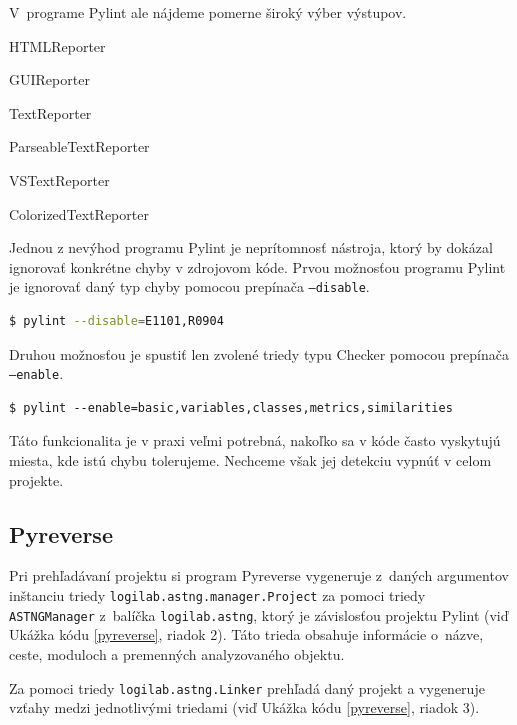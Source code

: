 \documentclass[11pt,oneside,final]{fithesis2}
\begin{document}
\begin{list}{•}{}
		V~programe Pylint ale nájdeme pomerne široký výber výstupov.
		
			    \begin{list}{•}{}
					\item HTMLReporter
					\item GUIReporter
					\item TextReporter
					\item ParseableTextReporter
					\item VSTextReporter
					\item ColorizedTextReporter
    			\end{list}
		
    \end{list}
	
Jednou z nevýhod programu Pylint je neprítomnosť nástroja, ktorý by dokázal ignorovať konkrétne chyby v zdrojovom kóde. Prvou možnosťou programu Pylint je ignorovať daný typ chyby pomocou prepínača \texttt{--disable}.

\begin{lstlisting}[language=bash]
$ pylint --disable=E1101,R0904
\end{lstlisting}

 Druhou možnosťou je spustiť len zvolené triedy typu Checker pomocou prepínača \texttt{--enable}. 	

\begin{lstlisting}
$ pylint --enable=basic,variables,classes,metrics,similarities
\end{lstlisting}

Táto funkcionalita je v praxi veľmi potrebná, nakoľko sa v kóde často vyskytujú miesta, kde istú chybu tolerujeme. Nechceme však jej detekciu vypnúť v celom projekte.
		
	\subsection{Pyreverse}
	Pri prehľadávaní projektu si program Pyreverse vygeneruje z~daných argumentov inštanciu triedy \texttt{logilab.astng.manager.Project} za pomoci triedy \texttt{ASTNGManager} z~balíčka \texttt{logilab.astng}, ktorý je závislosťou projektu Pylint (viď Ukážka kódu \ref{pyreverse}, riadok 2).
	Táto trieda obsahuje informácie o~názve, ceste, moduloch a premenných analyzovaného objektu.
	
		Za pomoci triedy \texttt{logilab.astng.Linker} prehľadá daný projekt a vygeneruje vzťahy medzi jednotlivými triedami (viď Ukážka kódu \ref{pyreverse}, riadok 3).
	
\end{document}
